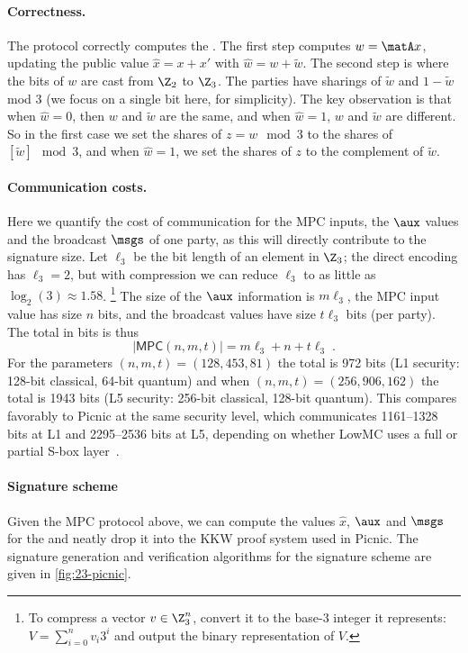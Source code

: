 \paragraph{Correctness.} The protocol correctly computes the \ttOWF.  The
first step computes $w = \matA x$,
updating the public value $\hat{x} = x + x'$ with $\hat{w} = w + \tilde{w}$.  The
second step is where the bits of $w$ are cast from $\Z_2$ to $\Z_3$.  The
parties have sharings of $\tilde{w}$ and $1-\tilde{w}$ mod 3 (we focus on a single bit here, for simplicity). The key observation is
that when $\hat{w} = 0$, then $w$ and $\tilde{w}$ are the same, and when $\hat{w} =
1$, $w$ and $\tilde{w}$ are different. So in the first case we set the shares of $ z =
w \mod 3$ to the shares of $[\tilde{w}] \mod 3$, and when $\hat{w} = 1$, we set the
shares of $z$ to the complement of $\tilde{w}$.

\paragraph{Communication costs.}
Here we quantify the cost of communication for the MPC inputs, the $\aux$ values and the broadcast $\msgs$ of one party,
as this will directly contribute to the signature size.
Let $\ell_3$ be the bit length of an element in $\Z_3$; the direct encoding has
$\ell_3 = 2$, but with compression we can reduce $\ell_3$ to as little as
$\log_2(3) \approx 1.58$. \footnote{To compress a vector $v\in\Z_3^{n}$, convert it to the base-3 integer it represents: $V = \sum_{i=0}^n v_i3^i$
and output the binary representation of $V$. }   The size of the
$\aux$ information is $m\ell_3$, the MPC input value has size $n$ bits,
and the broadcast values have size $t\ell_3$ bits (per party).
The total in bits is thus
\begin{equation} \label{eqn:sizeMPC}
|\textsf{MPC}(n,m,t)| = m\ell_3 + n + t\ell_3\;.
\end{equation}
For the parameters
$(n,m,t)=(128, 453, 81)$ the total is 972 bits (L1 security: 128-bit classical, 64-bit quantum)
and when $(n,m,t) = (256, 906, 162)$ the total is 1943 bits (L5 security: 256-bit classical, 128-bit quantum).  This compares favorably to
Picnic at the same security level, which communicates 1161--1328 bits at L1
and 2295--2536 bits at L5, depending on whether LowMC uses a full or partial S-box layer~\cite{kales2020-picnic}.

\paragraph{Signature scheme}
Given the MPC protocol above, we can compute the values $\hat{x}$, $\aux$ and
$\msgs$ for the \ttOWF and neatly drop it into the KKW proof system used in
Picnic.  The signature generation and verification algorithms for the
\ttOWF  signature scheme are given in \cref{fig:23-picnic}.


